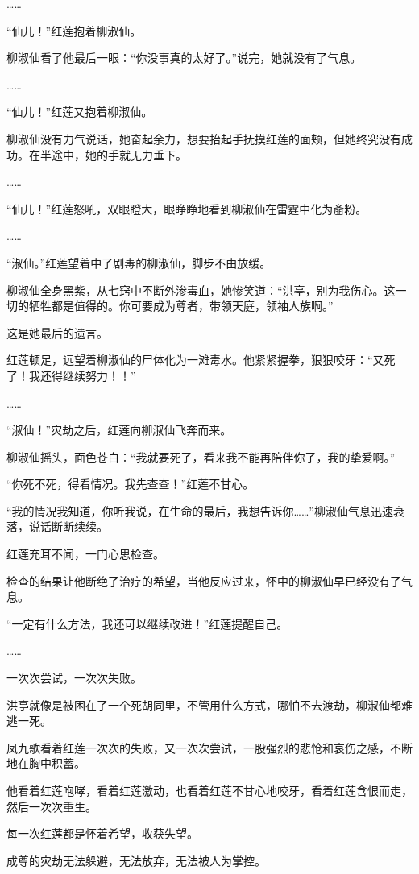 \begin{this_body}
……

“仙儿！”红莲抱着柳淑仙。

柳淑仙看了他最后一眼：“你没事真的太好了。”说完，她就没有了气息。

……

“仙儿！”红莲又抱着柳淑仙。

柳淑仙没有力气说话，她奋起余力，想要抬起手抚摸红莲的面颊，但她终究没有成功。在半途中，她的手就无力垂下。

……

“仙儿！”红莲怒吼，双眼瞪大，眼睁睁地看到柳淑仙在雷霆中化为齑粉。

……

“淑仙。”红莲望着中了剧毒的柳淑仙，脚步不由放缓。

柳淑仙全身黑紫，从七窍中不断外渗毒血，她惨笑道：“洪亭，别为我伤心。这一切的牺牲都是值得的。你可要成为尊者，带领天庭，领袖人族啊。”

这是她最后的遗言。

红莲顿足，远望着柳淑仙的尸体化为一滩毒水。他紧紧握拳，狠狠咬牙：“又死了！我还得继续努力！！”

……

“淑仙！”灾劫之后，红莲向柳淑仙飞奔而来。

柳淑仙摇头，面色苍白：“我就要死了，看来我不能再陪伴你了，我的挚爱啊。”

“你死不死，得看情况。我先查查！”红莲不甘心。

“我的情况我知道，你听我说，在生命的最后，我想告诉你……”柳淑仙气息迅速衰落，说话断断续续。

红莲充耳不闻，一门心思检查。

检查的结果让他断绝了治疗的希望，当他反应过来，怀中的柳淑仙早已经没有了气息。

“一定有什么方法，我还可以继续改进！”红莲提醒自己。

……

一次次尝试，一次次失败。

洪亭就像是被困在了一个死胡同里，不管用什么方式，哪怕不去渡劫，柳淑仙都难逃一死。

凤九歌看着红莲一次次的失败，又一次次尝试，一股强烈的悲怆和哀伤之感，不断地在胸中积蓄。

他看着红莲咆哮，看着红莲激动，也看着红莲不甘心地咬牙，看着红莲含恨而走，然后一次次重生。

每一次红莲都是怀着希望，收获失望。

成尊的灾劫无法躲避，无法放弃，无法被人为掌控。


\end{this_body}
